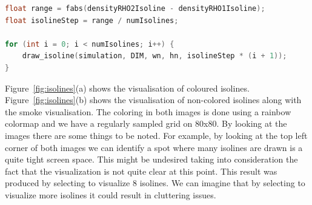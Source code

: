 \begin{lstlisting}[language=C++,label=lst:calculateIsolinesScalars,caption={Calculate scalar between range values and draw isolines.}]
float range = fabs(densityRHO2Isoline - densityRHO1Isoline);
float isolineStep = range / numIsolines;

for (int i = 0; i < numIsolines; i++) {
	draw_isoline(simulation, DIM, wn, hn, isolineStep * (i + 1));
}
\end{lstlisting}
 
Figure~\ref{fig:isolines}(a) shows the visualisation of coloured isolines. Figure~\ref{fig:isolines}(b) shows the visualisation of non-colored isolines along with the smoke visualisation. The coloring in both images is done using a rainbow colormap and we have a regularly sampled grid on 80x80. By looking at the images there are some things to be noted. For example, by looking at the top left corner of both images we can identify a spot where many isolines are drawn is a quite tight screen space. This might be undesired taking into consideration the fact that the visualization is not quite clear at this point. This result was produced by selecting to visualize 8 isolines. We can imagine that by selecting to visualize more isolines it could result in cluttering issues.

